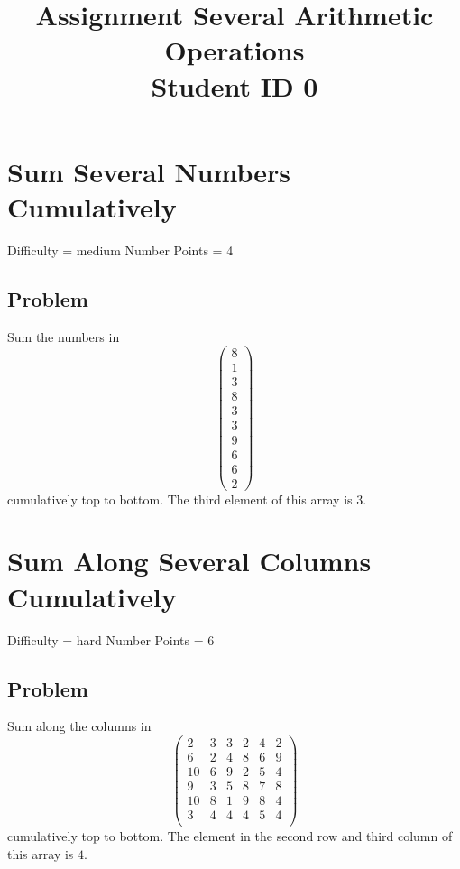 \documentclass{article}
\title{Assignment Several Arithmetic Operations \\ Student ID 0}
\begin{document}
\maketitle

\section{Sum Several Numbers Cumulatively}
Difficulty = medium
Number Points = 4
\subsection{Problem}
Sum the numbers in $$\begin{pmatrix}
8\\1\\3\\8\\3\\3\\9\\6\\6\\2\end{pmatrix}
$$ cumulatively top to bottom. The third element of this array is $3$.
\vspace{6cm} 
\section{Sum Along Several Columns Cumulatively}
Difficulty = hard
Number Points = 6
\subsection{Problem}
Sum along the columns in $$\begin{pmatrix}
2&3&3&2&4&2\\6&2&4&8&6&9\\10&6&9&2&5&4\\9&3&5&8&7&8\\10&8&1&9&8&4\\3&4&4&4&5&4\\\end{pmatrix}
$$ cumulatively top to bottom. The element in the second row and third column of this array is $4$.
\vspace{6cm} 
\end{document}
